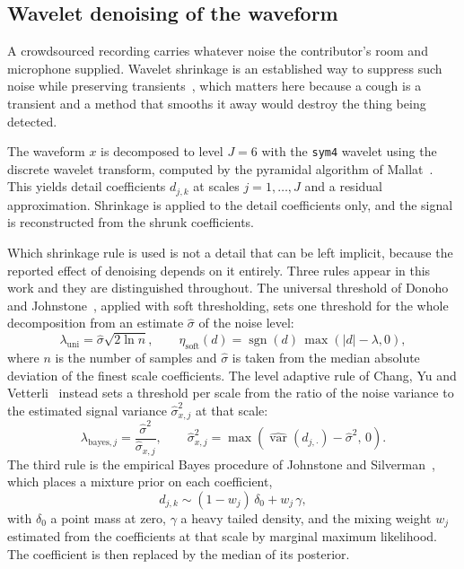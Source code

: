\documentclass{ieeeaccess}
\begin{document}
\subsection{Wavelet denoising of the waveform}\label{sec:design-denoise}

A crowdsourced recording carries whatever noise the contributor's room and microphone
supplied. Wavelet shrinkage is an established way to suppress such noise while preserving
transients~\cite{donoho1994}, which matters here because a cough is a transient and a
method that smooths it away would destroy the thing being detected.

The waveform $x$ is decomposed to level $J = 6$ with the \texttt{sym4} wavelet using the
discrete wavelet transform, computed by the pyramidal algorithm of
Mallat~\cite{mallat1989}. This yields detail coefficients $d_{j,k}$ at scales
$j = 1, \dots, J$ and a residual approximation. Shrinkage is applied to the detail
coefficients only, and the signal is reconstructed from the shrunk coefficients.

Which shrinkage rule is used is not a detail that can be left implicit, because the
reported effect of denoising depends on it entirely. Three rules appear in this work and
they are distinguished throughout. The universal threshold of Donoho and
Johnstone~\cite{donoho1994}, applied with soft thresholding, sets one threshold for the
whole decomposition from an estimate $\hat{\sigma}$ of the noise level:
\begin{equation}
\lambda_{\mathrm{uni}} = \hat{\sigma}\sqrt{2\ln n},
\qquad
\eta_{\mathrm{soft}}(d) = \operatorname{sgn}(d)\,\max(|d| - \lambda, 0),
\label{eq:visu}
\end{equation}
where $n$ is the number of samples and $\hat{\sigma}$ is taken from the median absolute
deviation of the finest scale coefficients. The level adaptive rule of Chang, Yu and
Vetterli~\cite{chang2000} instead sets a threshold per scale from the ratio of the noise
variance to the estimated signal variance $\hat{\sigma}_{x,j}^{2}$ at that scale:
\begin{equation}
\lambda_{\mathrm{bayes},j} = \frac{\hat{\sigma}^{2}}{\hat{\sigma}_{x,j}},
\qquad
\hat{\sigma}_{x,j}^{2} = \max\!\left(\widehat{\operatorname{var}}(d_{j,\cdot})
  - \hat{\sigma}^{2},\, 0\right).
\label{eq:bayes}
\end{equation}
The third rule is the empirical Bayes procedure of Johnstone and
Silverman~\cite{johnstone2005}, which places a mixture prior on each coefficient,
\begin{equation}
d_{j,k} \sim (1 - w_j)\,\delta_0 + w_j\,\gamma,
\label{eq:eb}
\end{equation}
with $\delta_0$ a point mass at zero, $\gamma$ a heavy tailed density, and the mixing
weight $w_j$ estimated from the coefficients at that scale by marginal maximum
likelihood. The coefficient is then replaced by the median of its posterior.
\end{document}
